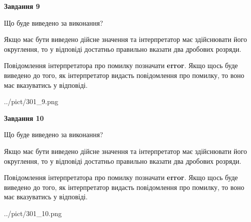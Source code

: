 \documentclass[12pt, ukrainian]{article}
\begin{document}
{\begin {Large}
{\begin {center}\textbf{Завдання 9}\end {center}}\par
Що буде виведено за виконання? \par

Якщо має бути виведено дійсне значення та інтерпретатор має здійснювати його округлення, 
то у відповіді достатньо правильно вказати два дробових розряди.

Повідомлення інтерпретатора про помилку позначати \textbf{error}.
Якщо щось буде виведено до того, як інтерпретатор видасть повідомлення про помилку, 
то воно має вказуватись у відповіді. \par

\begin{center}
	{../pict/301_9.png}
\end{center}
\newpage

{\begin {center}\textbf{Завдання 10}\end {center}}\par
Що буде виведено за виконання? \par

Якщо має бути виведено дійсне значення та інтерпретатор має здійснювати його округлення, 
то у відповіді достатньо правильно вказати два дробових розряди.

Повідомлення інтерпретатора про помилку позначати \textbf{error}.
Якщо щось буде виведено до того, як інтерпретатор видасть повідомлення про помилку, 
то воно має вказуватись у відповіді. \par

\begin{center}
	{../pict/301_10.png}
\end{center}
\newpage

\end {Large}}
\end{document}
